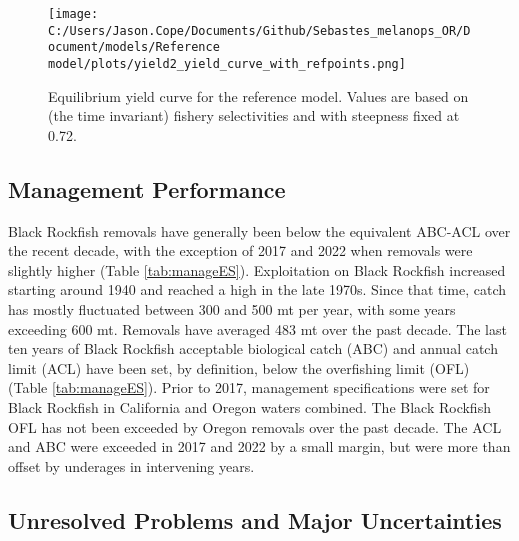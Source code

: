 \documentclass[11pt,
  letterpaper,
]{article}
\begin{document}
\begin{figure}
{\centering
\texttt{[image: C:/Users/Jason.Cope/Documents/Github/Sebastes\_melanops\_OR/Document/models/Reference model/plots/yield2\_yield\_curve\_with\_refpoints.png]}
}
\caption{Equilibrium yield curve for the reference model. Values are based on (the time invariant)
fishery selectivities and with steepness fixed at 0.72.\label{fig:es-yield}}
\end{figure}

\clearpage



\clearpage

\hypertarget{management-performance}{%
\subsection*{Management Performance}\label{management-performance}}

Black Rockfish removals have generally been below the equivalent ABC-ACL over the recent decade, with the exception of 2017 and 2022 when removals were slightly higher (Table \ref{tab:manageES}). Exploitation on Black Rockfish increased starting around 1940 and reached a high in the late 1970s. Since that time, catch has mostly fluctuated between 300 and 500 mt per year, with some years exceeding 600 mt. Removals have averaged 483 mt over the past decade. The last ten years of Black Rockfish acceptable biological catch (ABC) and annual catch limit (ACL) have been set, by definition, below the overfishing limit (OFL) (Table \ref{tab:manageES}). Prior to 2017, management specifications were set for Black Rockfish in California and Oregon waters combined. The Black Rockfish OFL has not been exceeded by Oregon removals over the past decade. The ACL and ABC were exceeded in 2017 and 2022 by a small margin, but were more than offset by underages in intervening years.



\hypertarget{unresolved-problems-and-major-uncertainties}{%
\subsection*{Unresolved Problems and Major Uncertainties}\label{unresolved-problems-and-major-uncertainties}}
\end{document}
